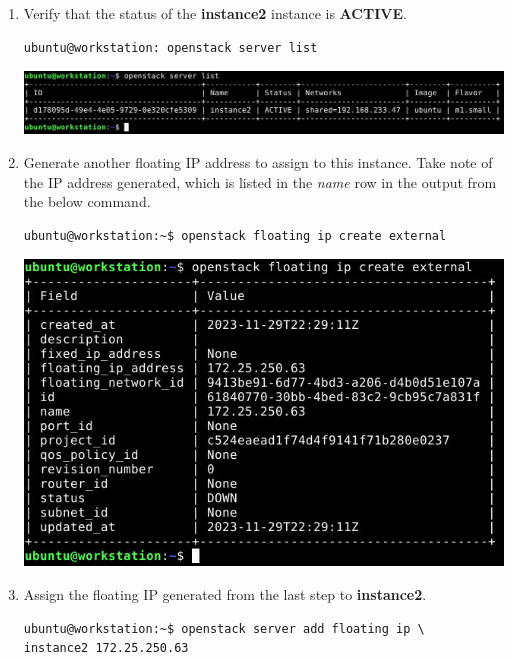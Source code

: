 \documentclass[letterpaper, 12pt]{article}
\begin{document}
\begin{enumerate}
    \item Verify that the status of the \textbf{instance2} instance is \textbf{ACTIVE}.
\begin{lstlisting}
ubuntu@workstation: openstack server list
\end{lstlisting}

    \begin{center}
        \includegraphics[width=\linewidth]{images/part1/step36.png}
    \end{center}

    \item Generate another floating IP address to assign to this instance. Take note of the IP address generated, which
    is listed in the \textit{name} row in the output from the below command.
\begin{lstlisting}
ubuntu@workstation:~$ openstack floating ip create external
\end{lstlisting}

    \begin{center}
        \includegraphics[width=\linewidth]{images/part1/step37.png}
    \end{center}

    \item Assign the floating IP generated from the last step to \textbf{instance2}.
\begin{lstlisting}
ubuntu@workstation:~$ openstack server add floating ip \
instance2 172.25.250.63
\end{lstlisting}


\end{enumerate}
\end{document}
